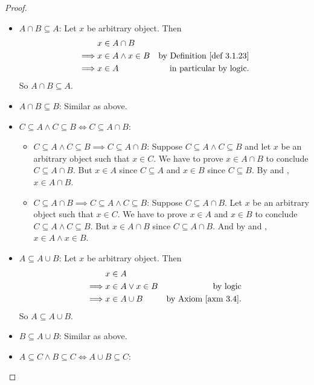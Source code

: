 \begin{proof}
\begin{itemize}
    \item \(A \cap B \subseteq A\): Let \(x\) be arbitrary object. Then
        \begin{align*}
                     & x \in A \cap B \\
            \implies & x \in A \land x \in B & \text{by \DEF{3.1.23}} \\
            \implies & x \in A & \text{in particular by logic}.
        \end{align*}
        So \(A \cap B \subseteq A\).
    \item \(A \cap B \subseteq B\): Similar as above.
    \item \(C \subseteq A \land C \subseteq B \iff C \subseteq A \cap B\):
        \begin{itemize}
            \item \(C \subseteq A \land C \subseteq B \implies C \subseteq A \cap B\): Suppose \(C \subseteq A \land C \subseteq B\) and let \(x\) be an arbitrary object such that \(x \in C\). We have to prove \(x \in A \cap B\) to conclude \(C \subseteq A \cap B\). But \(x \in A\)  since \(C \subseteq A\) and \(x \in B\)  since \(C \subseteq B\). By  and , \(x \in A \cap B\).
            \item \(C \subseteq A \cap B \implies C \subseteq A \land C \subseteq B\): Suppose \(C \subseteq A \cap B\). Let \(x\) be an arbitrary object such that \(x \in C\). We have to prove \(x \in A\) and \(x \in B\) to conclude \(C \subseteq A \land C \subseteq B\). But \(x \in A \cap B\)  since \(C \subseteq A \cap B\). And by  and , \(x \in A \land x \in B\).
        \end{itemize}
    \item \(A \subseteq A \cup B\): Let \(x\) be arbitrary object. Then
        \begin{align*}
                     & x \in A \\
            \implies & x \in A \lor x \in B & \text{by logic} \\
            \implies & x \in A \cup B & \text{by \AXM{3.4}}.
        \end{align*}
        So \(A \subseteq A \cup B\).
    \item \(B \subseteq A \cup B\): Similar as above.
    \item \(A \subseteq C \land B \subseteq C \iff A \cup B \subseteq C\):

\end{itemize}
\end{proof}
